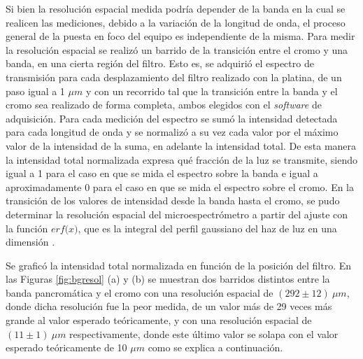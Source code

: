 Si bien la resolución espacial medida podría depender de la banda en la cual se realicen las mediciones, debido a la variación de la longitud de onda, el proceso general de la puesta en foco del equipo es independiente de la misma. Para medir la resolución espacial se realizó un barrido de la transición entre el cromo y una banda, en una cierta región del filtro. Esto es, se adquirió el espectro de transmisión para cada desplazamiento del filtro realizado con la platina, de un paso igual a 1 $\mu m$ y con un recorrido tal que la transición entre la banda y el cromo sea realizado de forma completa, ambos elegidos con el \textit{software} de adquisición. Para cada medición del espectro se sumó la intensidad detectada para cada longitud de onda y se normalizó a su vez cada valor por el máximo valor de la intensidad de la suma, en adelante la intensidad total. De esta manera la intensidad total normalizada expresa qué fracción de la luz se transmite, siendo igual a 1 para el caso en que se mida el espectro sobre la banda e igual a aproximadamente 0 para el caso en que se mida el espectro sobre el cromo. En la transición de los valores de intensidad desde la banda hasta el cromo, se pudo determinar la resolución espacial del microespectrómetro a partir del ajuste con la función $\textit{erf(x)}$, que es la integral del perfil gaussiano del haz de luz en una dimensión \cite{LASCH}. 

Se graficó la intensidad total normalizada en función de la posición del filtro. En las Figuras \ref{fig:bgresol} (a) y (b) se muestran dos barridos distintos entre la banda pancromática y el cromo con una resolución espacial de $(292 \pm 12)~ \mu m$, donde dicha resolución fue la peor medida, de un valor más de 29 veces más grande al valor esperado teóricamente, y con una resolución espacial de $(11 \pm 1)~ \mu m$ respectivamente, donde este último valor se solapa con el valor esperado teóricamente de 10 $\mu m$ como se explica a continuación.

